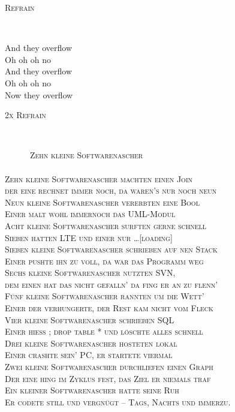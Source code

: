 \documentclass[11pt,a5paper]{article}
\newcommand\refrain[1]{\begin{tcolorbox}#1\end{tcolorbox} \ }
\newcommand{\refrefrain}{\refrain{\textsc{Refrain}} \ }
\newcommand{\refrefraintwice}{\refrain{\textsc{2x Refrain}} \ }
\begin{document}
\refrefrain

And they overflow \\
Oh oh oh no \\
And they overflow \\
Oh oh oh no \\
Now they overflow \\

\refrefraintwice
	
	\vspace*{3cm}

		\textsc{\ \ \ \ \ \ Zehn kleine Softwarenascher \\
			\ \\
			Zehn kleine Softwarenascher machten einen Join \\
			der eine rechnet immer noch, da waren's nur noch neun \\
			Neun kleine Softwarenascher vererbten eine Bool \\
			Einer malt wohl immernoch das UML-Modul \\
			Acht kleine Softwarenascher surften gerne schnell \\
			Sieben hatten LTE und einer nur \ldots [loading] \\
			Sieben kleine Softwarenascher schrieben auf nen Stack \\
			Einer pushte ihn zu voll, da war das Programm weg \\
			Sechs kleine Softwarenascher nutzten SVN, \\
			dem einen hat das nicht gefalln' da fing er an zu flenn' \\
			Fünf kleine Softwarenascher rannten um die Wett' \\
			Einer der verhungerte, der Rest kam nicht vom Fleck \\
			Vier kleine Softwarenascher schrieben SQL \\
			Einer hieß ; drop table * und löschte alles schnell \\
			Drei kleine Softwarenascher hosteten lokal \\
			Einer crashte sein' PC, er startete viermal \\
			Zwei kleine Softwarenascher durchliefen einen Graph \\
			Der eine hing im Zyklus fest, das Ziel er niemals traf \\
			Ein kleiner Softwarenascher hatte seine Ruh \\
			Er codete still und vergnügt -- Tags, Nachts und immerzu.}	

\pagebreak
\end{document}
